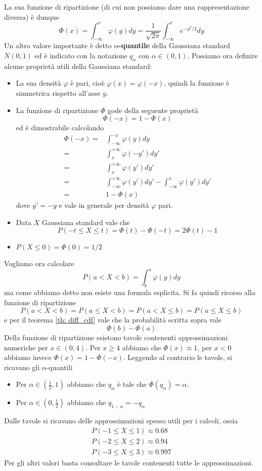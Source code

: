 La sua funzione di ripartizione (di cui non possiamo dare una
rappresentazione diversa) è dunque
\[
	\Phi(x) = \int_{-\infty}^x \varphi(y) dy =
	\frac{1}{\sqrt{2 \pi}} \int_{-\infty}^x e^{-y^2 / 2} dy
\]
Un altro valore importante è detto $\alpha$\textbf{-quantile} della Gaussiana standard $N(0,1)$ ed
è indicato con la notazione $q_\alpha$ con $\alpha \in (0,1)$. Possiamo ora definire alcune
proprietà utili della Gaussiana standard:
\begin{itemize}
	\item La sua densità $\varphi$ è pari, cioè $\varphi(x) = \varphi(-x)$, quindi la funzione è
	      simmetrica rispetto all'asse $y$.
	\item La funzione di ripartizione $\Phi$ gode della seguente proprietà
	      \[ \Phi(-x) = 1 - \Phi(x) \]
	      ed è dimostrabile calcolando
	      \begin{align*}
		      \Phi(-x) = & \int_{-\infty}^{-x} \varphi(y) dy           \\
		      =          & \int_x^{+\infty} \varphi(-y') dy'           \\
		      =          & \int_x^{+\infty} \varphi(y') dy'            \\
		      =          & \int_{-\infty}^{+\infty} \varphi (y') dy' -
		      \int_{-\infty}^x \varphi (y') dy'                        \\
		      =          & 1 - \Phi(x)
	      \end{align*}
	      dove $y' = -y$ e vale in generale per densità $\varphi$ pari.
	\item Data $X$ Gaussiana standard vale che
	      \[ P(-t \leq X \leq t) = \Phi (t) - \Phi (-t) = 2 \Phi (t) - 1 \]
	\item $P(X \leq 0) = \Phi (0) = 1 / 2$
\end{itemize}
Vogliamo ora calcolare
\[ P(a < X < b) = \int_b^a \varphi (y) dy \]
ma come abbiamo detto non esiste una formula esplicita. Si fa quindi ricorso alla funzione di
ripartizione
\[ P(a < X < b) = P(a \leq X < b) = P(a < X \leq b) = P(a \leq X \leq b) \]
e per il teorema \ref{th: diff_cdf} vale che la probabilità scritta sopra vale
\[ \Phi(b) - \Phi(a) \]
Della funzione di ripartizione esistono tavole contenenti approssimazioni numeriche per
$x \in (0,4)$. Per $x \geq 4$ abbiamo che $\Phi(x) \approx 1$, per $x < 0$ abbiamo invece
$\Phi(x) = 1 - \Phi(-x)$. Leggendo al contrario le tavole, si ricavano gli $\alpha$-quantili
\begin{itemize}
	\item Per $\alpha \in \left(\frac{1}{2}, 1 \right)$ abbiamo che $q_\alpha$ è tale che
	      $\Phi(q_\alpha) = \alpha$.
	\item Per $\alpha \in \left(0, \frac{1}{2} \right)$ abbiamo che $q_{1-\alpha} = -q_\alpha$
\end{itemize}
Dalle tavole si ricavano delle approssimazioni spesso utili per i calcoli, ossia
\begin{gather*}
	P(-1 \leq X \leq 1) \approx 0.68 \\
	P(-2 \leq X \leq 2) \approx 0.94 \\
	P(-3 \leq X \leq 3) \approx 0.997
\end{gather*}
Per gli altri valori basta consultare le tavole contenenti tutte le approssimazioni.

